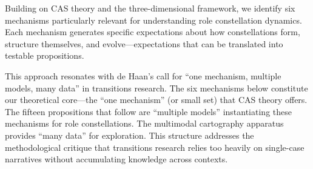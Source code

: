 \documentclass[../main.tex]{subfiles}
\begin{document}
Building on CAS theory and the three-dimensional framework, we identify six mechanisms particularly relevant for understanding role constellation dynamics. Each mechanism generates specific expectations about how constellations form, structure themselves, and evolve---expectations that can be translated into testable propositions.

This approach resonates with de Haan's \cite{dehaan2025makingscience} call for ``one mechanism, multiple models, many data'' in transitions research. The six mechanisms below constitute our theoretical core---the ``one mechanism'' (or small set) that CAS theory offers. The fifteen propositions that follow are ``multiple models'' instantiating these mechanisms for role constellations. The multimodal cartography apparatus provides ``many data'' for exploration. This structure addresses the methodological critique that transitions research relies too heavily on single-case narratives without accumulating knowledge across contexts.
\end{document}
